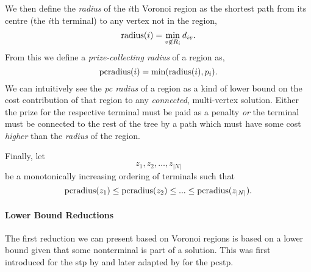 We then define the \textit{radius} of the $i$th Voronoi region as the shortest path
from its centre (the $i$th terminal)
to any vertex not in the region,
\[\operatorname{radius}(i) = \min_{v \not\in R_i} d_{iv}\mathnormal{.}\]
From this we define a \textit{prize-collecting radius} of a region as,
\[\operatorname{pcradius}(i) = \min(\operatorname{radius}(i), p_i)\mathnormal{.}\]
We can intuitively see the \textit{pc radius} of a region as a kind of lower bound
on the cost contribution
 of that region to any
 \textit{connected}, multi-vertex solution. Either the prize for the respective terminal must be paid as a penalty
 \textit{or} the terminal must be connected to the rest of the tree by a path which must have some cost \textit{higher}
 than the \textit{radius} of the region.

 Finally, let
 \[z_1, z_2, \ldots, z_{|N|}\]
 be a monotonically increasing ordering of terminals such that
\[\operatorname{pcradius}(z_1) \leq \operatorname{pcradius}(z_2) \leq ... \leq \operatorname{pcradius}(z_{|N|})\mathnormal{.}\]

\paragraph{Lower Bound Reductions}

The first reduction we can present based on Voronoi regions is based on a lower bound given that some nonterminal is
part of a solution. This was first introduced for the \gls{stp} by \citet{polzin2001improved} and later adapted by
\citet{rehfeldt2016reduction} for the \gls{pcstp}.

